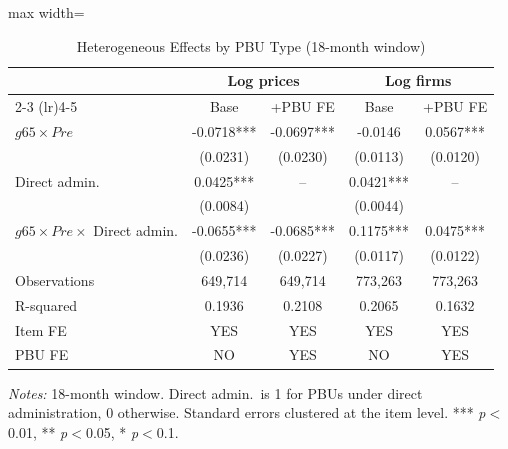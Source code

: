 \begin{table}[htbp]
\centering
\caption{Heterogeneous Effects by PBU Type (18-month window)}
\label{tab:heterog_pbu}
\begin{adjustbox}{max width=\textwidth}
\begin{threeparttable}
\small
\begin{tabular}{lcccc}
\toprule
 & \multicolumn{2}{c}{Log prices} & \multicolumn{2}{c}{Log firms} \\
\cmidrule(lr){2-3} \cmidrule(lr){4-5}
 & Base & +PBU FE & Base & +PBU FE \\
\midrule
$g65 \times Pre$ & -0.0718*** & -0.0697*** & -0.0146 & 0.0567*** \\
 & (0.0231) & (0.0230) & (0.0113) & (0.0120) \\
Direct admin. & 0.0425*** & -- & 0.0421*** & -- \\
 & (0.0084) &  & (0.0044) &  \\
$g65 \times Pre \times$ Direct admin. & -0.0655*** & -0.0685*** & 0.1175*** & 0.0475*** \\
 & (0.0236) & (0.0227) & (0.0117) & (0.0122) \\
\midrule
Observations & 649,714 & 649,714 & 773,263 & 773,263 \\
R-squared & 0.1936 & 0.2108 & 0.2065 & 0.1632 \\
Item FE & YES & YES & YES & YES \\
PBU FE & NO & YES & NO & YES \\
\bottomrule
\end{tabular}
\begin{tablenotes}
\small
\item \textit{Notes:} 18-month window. Direct admin.~is 1 for PBUs under direct administration, 0 otherwise.
Standard errors clustered at the item level.
*** \textit{p}$<$0.01, ** \textit{p}$<$0.05, * \textit{p}$<$0.1.
\end{tablenotes}
\end{threeparttable}
\end{adjustbox}
\end{table}
